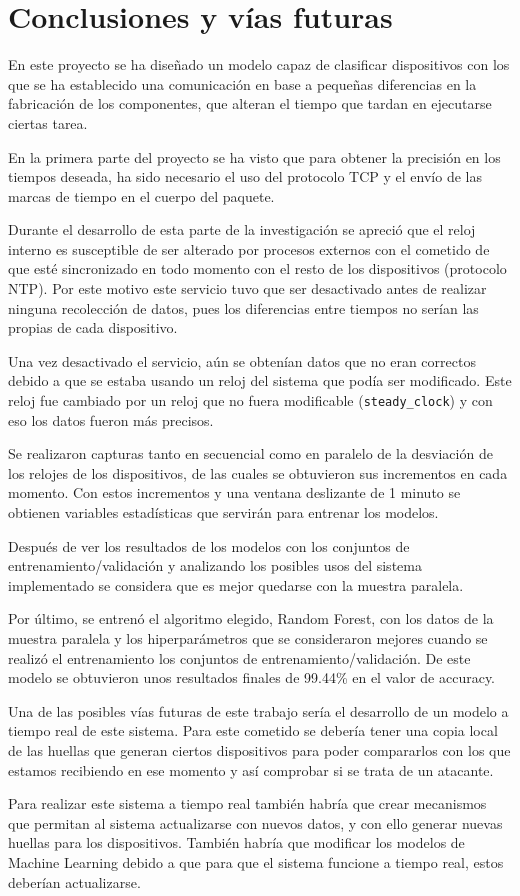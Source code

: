 
\chapter{Conclusiones y vías futuras} \label{chap:conclu}

En este proyecto se ha diseñado un modelo capaz de clasificar dispositivos con los que se ha establecido una comunicación en base a pequeñas diferencias en la fabricación de los componentes, que alteran el tiempo que tardan en ejecutarse ciertas tarea.

En la primera parte del proyecto se ha visto que para obtener la precisión en los tiempos deseada, ha sido necesario el uso del protocolo TCP y el envío de las marcas de tiempo en el cuerpo del paquete. 

Durante el desarrollo de esta parte de la investigación se apreció que el reloj interno es susceptible de ser alterado por procesos externos con el cometido de que esté sincronizado en todo momento con el resto de los dispositivos (protocolo NTP). Por este motivo este servicio tuvo que ser desactivado antes de realizar ninguna recolección de datos, pues los diferencias entre tiempos no serían las propias de cada dispositivo.

Una vez desactivado el servicio, aún se obtenían datos que no eran correctos debido a que se estaba usando un reloj del sistema que podía ser modificado. Este reloj fue cambiado por un reloj que no fuera modificable (\texttt{steady\_clock}) y con eso los datos fueron más precisos.

Se realizaron capturas tanto en secuencial como en paralelo de la desviación de los relojes de los dispositivos, de las cuales se obtuvieron sus incrementos en cada momento. Con estos incrementos y una ventana deslizante de 1 minuto se obtienen variables estadísticas que servirán para entrenar los modelos.

Después de ver los resultados de los modelos con los conjuntos de entrenamiento/validación y analizando los posibles usos del sistema implementado se considera que es mejor quedarse con la muestra paralela. 

Por último, se entrenó el algoritmo elegido, Random Forest, con los datos de la muestra paralela y los hiperparámetros que se consideraron mejores cuando se realizó el entrenamiento los conjuntos de entrenamiento/validación. De este modelo se obtuvieron unos resultados finales de 99.44\% en el valor de accuracy.

Una de las posibles vías futuras de este trabajo sería el desarrollo de un modelo a tiempo real de este sistema. Para este cometido se debería tener una copia local de las huellas que generan ciertos dispositivos para poder compararlos con los que estamos recibiendo en ese momento y así comprobar si se trata de un atacante.

Para realizar este sistema a tiempo real también habría que crear mecanismos que permitan al sistema actualizarse con nuevos datos, y con ello generar nuevas huellas para los dispositivos. También habría que modificar los modelos de Machine Learning debido a que para que el sistema funcione a tiempo real, estos deberían actualizarse. 


